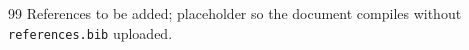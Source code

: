\documentclass[11pt,a4paper]{report}
\begin{document}
%
\begin{thebibliography}{99}
 References to be added; placeholder so the document compiles
without \texttt{references.bib} uploaded.
\end{thebibliography}
\end{document}
